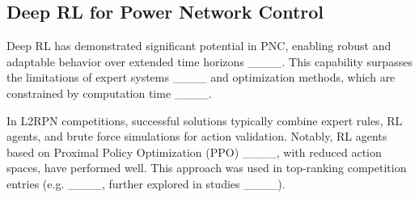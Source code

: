 



\subsection{Deep RL for Power Network Control}\label{sec:RLL2RPN}
Deep RL has demonstrated significant potential in PNC, enabling robust and adaptable behavior over extended time horizons ____. This capability surpasses the limitations of expert systems ____ and optimization methods, which are constrained by computation time ____.

In L2RPN competitions, successful solutions typically combine expert rules, RL agents, and brute force simulations for action validation. Notably, RL agents based on Proximal Policy Optimization (PPO) ____, with reduced action spaces, have performed well. This approach was used in top-ranking competition entries (e.g. ____, further explored in  studies ____).

